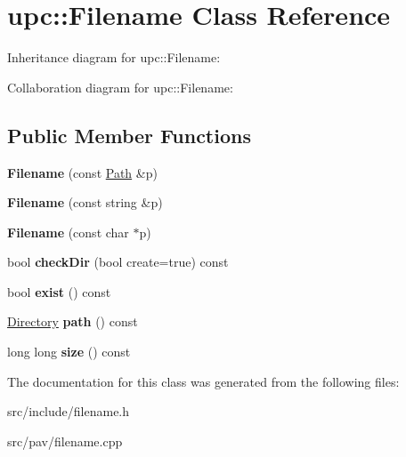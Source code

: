 \hypertarget{classupc_1_1Filename}{}\section{upc\+:\+:Filename Class Reference}
\label{classupc_1_1Filename}


Inheritance diagram for upc\+:\+:Filename\+:


Collaboration diagram for upc\+:\+:Filename\+:
\subsection*{Public Member Functions}
\begin{DoxyCompactItemize}
\item 
\mbox{\label{classupc_1_1Filename_a80bdd15a0d0da8cf97a59125c3cae2c9}} 
{\bfseries Filename} (const \hyperlink{classupc_1_1Path}{Path} \&p)
\item 
\mbox{\label{classupc_1_1Filename_a13e550c5b28bf991c84c053035760ed4}} 
{\bfseries Filename} (const string \&p)
\item 
\mbox{\label{classupc_1_1Filename_a005b26738aa7db3b9f89258600b1e6f3}} 
{\bfseries Filename} (const char $\ast$p)
\item 
\mbox{\label{classupc_1_1Filename_a05b25a82d938ded560351a13ddea3879}} 
bool {\bfseries check\+Dir} (bool create=true) const
\item 
\mbox{\label{classupc_1_1Filename_a6328d5ecc92b9dd4ca15a6cd0390dceb}} 
bool {\bfseries exist} () const
\item 
\mbox{\label{classupc_1_1Filename_ac7146f108eedbbf0bf73f54bbe6754f7}} 
\hyperlink{classupc_1_1Directory}{Directory} {\bfseries path} () const
\item 
\mbox{\label{classupc_1_1Filename_a196cf2ea31fa9884b8627696d3e27c04}} 
long long {\bfseries size} () const
\end{DoxyCompactItemize}


The documentation for this class was generated from the following files\+:\begin{DoxyCompactItemize}
\item 
src/include/filename.\+h\item 
src/pav/filename.\+cpp\end{DoxyCompactItemize}
